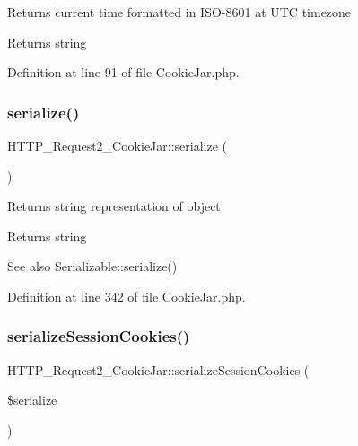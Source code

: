 Returns current time formatted in I\+S\+O-\/8601 at U\+TC timezone

\begin{DoxyReturn}{Returns}
string 
\end{DoxyReturn}


Definition at line 91 of file Cookie\+Jar.\+php.

\mbox{\label{classHTTP__Request2__CookieJar_ac6fa68d8621d1aef56c0eb8231612839}} 
\subsubsection{\texorpdfstring{serialize()}{serialize()}}
{\footnotesize\ttfamily H\+T\+T\+P\+\_\+\+Request2\+\_\+\+Cookie\+Jar\+::serialize (\begin{DoxyParamCaption}{ }\end{DoxyParamCaption})}

Returns string representation of object

\begin{DoxyReturn}{Returns}
string
\end{DoxyReturn}
\begin{DoxySeeAlso}{See also}
Serializable\+::serialize() 
\end{DoxySeeAlso}


Definition at line 342 of file Cookie\+Jar.\+php.

\mbox{\label{classHTTP__Request2__CookieJar_a2a81535d5a9762c3d6ae9229f2349813}} 
\subsubsection{\texorpdfstring{serialize\+Session\+Cookies()}{serializeSessionCookies()}}
{\footnotesize\ttfamily H\+T\+T\+P\+\_\+\+Request2\+\_\+\+Cookie\+Jar\+::serialize\+Session\+Cookies (\begin{DoxyParamCaption}\item[{}]{\$serialize }\end{DoxyParamCaption})}


